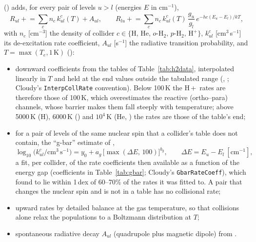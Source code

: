  () adds, for every pair of
levels $u>l$ (energies $E$ in cm$^{-1}$),
\begin{equation}
  R_{ul} \mathrel{+}= \sum_c n_c\,k^c_{ul}(T) + A_{ul},\qquad
  R_{lu} \mathrel{+}= \sum_c n_c\,k^c_{ul}(T)\,\frac{g_u}{g_l}\,e^{-hc(E_u-E_l)/kT},
  \label{eq:collrad}
\end{equation}
with $n_c$ [cm$^{-3}$] the density of collider
$c\in\{\mathrm H,\,\mathrm{He},\,o\text{-H}_2,\,p\text{-H}_2,\,\mathrm H^+\}$, $k^c_{ul}$
[cm$^3$\,s$^{-1}$] its de-excitation rate coefficient, $A_{ul}$ [s$^{-1}$] the
radiative transition probability, and $T=\max(T_e,1\,\mathrm K)$
():
\begin{itemize}
\item downward coefficients from the tables of Table~\ref{tab:h2data},
  interpolated linearly in $T$ and held at the end values outside the
  tabulated range (, ; Cloudy's
  \texttt{InterpCollRate} convention). Below 100\,K the H\,+\,\Htwo{} rates are
  therefore those of 100\,K, which overestimates the reactive (ortho--para)
  channels, whose barrier makes them fall steeply with temperature; above
  5000\,K (H), 6000\,K (\Hp) and $10^4$\,K (He, \Htwo) the rates are those of the
  table's end;
\item for a pair of levels of the same nuclear spin that a collider's table
  does not contain, the ``g-bar'' estimate of \citet[their eq.~1 and
  Table~2]{Shaw2005},
  \begin{equation}
    \log_{10}\bigl(k^c_{ul}/\mathrm{cm^3\,s^{-1}}\bigr) = y_0 + a_g\,\bigl[\max(\Delta E,\,100)\bigr]^{b_g},
    \qquad \Delta E = E_u-E_l\ [\mathrm{cm^{-1}}],
    \label{eq:gbar}
  \end{equation}
  a fit, per collider, of the rate coefficients then available as a function
  of the energy gap (coefficients in Table~\ref{tab:gbar}; Cloudy's
  \texttt{GbarRateCoeff}), which \citet{Shaw2005} found to lie within 1\,dex of
  60--70\% of the rates it was fitted to. A pair that changes the nuclear spin
  and is not in a table has no collisional rate;
\item upward rates by detailed balance at the gas temperature, so that
  collisions alone relax the populations to a Boltzmann distribution at $T$;
\item spontaneous radiative decay $A_{ul}$ (quadrupole plus magnetic dipole)
  from .
\end{itemize}

